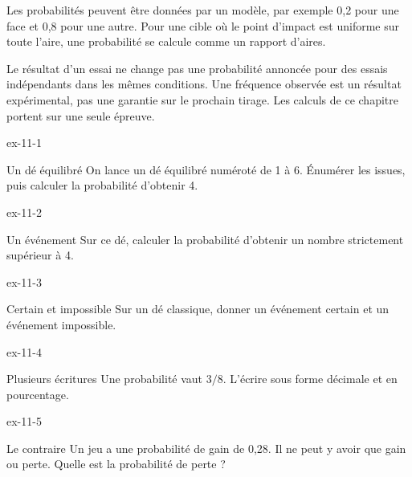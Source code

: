 \begin{savoirfaire}Les probabilités peuvent être données par un modèle, par exemple 0,2 pour une face et 0,8 pour une autre. Pour une cible où le point d’impact est uniforme sur toute l’aire, une probabilité se calcule comme un rapport d’aires.\end{savoirfaire}
\begin{attention}Le résultat d’un essai ne change pas une probabilité annoncée pour des essais indépendants dans les mêmes conditions. Une fréquence observée est un résultat expérimental, pas une garantie sur le prochain tirage. Les calculs de ce chapitre portent sur une seule épreuve.\end{attention}

\clearpage{}
\begin{blocLivre}{ex-11-1}\begin{exercice}[1]{Un dé équilibré}
On lance un dé équilibré numéroté de 1 à 6. Énumérer les issues, puis calculer la probabilité d’obtenir 4.
\end{exercice}\end{blocLivre}
\begin{blocLivre}{ex-11-2}\begin{exercice}[1]{Un événement}
Sur ce dé, calculer la probabilité d’obtenir un nombre strictement supérieur à 4.
\end{exercice}\end{blocLivre}
\begin{blocLivre}{ex-11-3}\begin{exercice}[1]{Certain et impossible}
Sur un dé classique, donner un événement certain et un événement impossible.
\end{exercice}\end{blocLivre}
\begin{blocLivre}{ex-11-4}\begin{exercice}[1]{Plusieurs écritures}
Une probabilité vaut $3/8$. L’écrire sous forme décimale et en pourcentage.
\end{exercice}\end{blocLivre}
\begin{blocLivre}{ex-11-5}\begin{exercice}[1]{Le contraire}
Un jeu a une probabilité de gain de 0,28. Il ne peut y avoir que gain ou perte. Quelle est la probabilité de perte ?
\end{exercice}\end{blocLivre}

